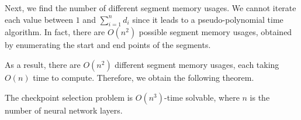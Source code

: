 Next, we find the number of different segment memory usages.
We cannot iterate each value between $1$ and $\sum_{i = 1}^n d_i$ since it leads to a pseudo-polynomial time algorithm.
In fact, there are $O(n^2)$ possible segment memory usages, obtained by enumerating the start and end points of the segments.

As a result, there are $O(n^2)$ different segment memory usages, each taking $O(n)$ time to compute.
Therefore, we obtain the following theorem.



\begin{theorem}
\label{thm:checkpoint-selection-problem}
The checkpoint selection problem is $O(n^3)$-time solvable, where $n$ is the number of neural network layers.
\end{theorem}